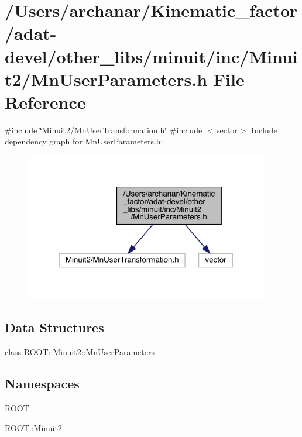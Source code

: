 \hypertarget{adat-devel_2other__libs_2minuit_2inc_2Minuit2_2MnUserParameters_8h}{}\section{/\+Users/archanar/\+Kinematic\+\_\+factor/adat-\/devel/other\+\_\+libs/minuit/inc/\+Minuit2/\+Mn\+User\+Parameters.h File Reference}
\label{adat-devel_2other__libs_2minuit_2inc_2Minuit2_2MnUserParameters_8h}
{\ttfamily \#include \char`\"{}Minuit2/\+Mn\+User\+Transformation.\+h\char`\"{}}\newline
{\ttfamily \#include $<$vector$>$}\newline
Include dependency graph for Mn\+User\+Parameters.\+h\+:
\nopagebreak
\begin{figure}[H]
\begin{center}
\leavevmode
\includegraphics[width=302pt]{d5/d43/adat-devel_2other__libs_2minuit_2inc_2Minuit2_2MnUserParameters_8h__incl}
\end{center}
\end{figure}
\subsection*{Data Structures}
\begin{DoxyCompactItemize}
\item 
class \mbox{\hyperlink{classROOT_1_1Minuit2_1_1MnUserParameters}{R\+O\+O\+T\+::\+Minuit2\+::\+Mn\+User\+Parameters}}
\end{DoxyCompactItemize}
\subsection*{Namespaces}
\begin{DoxyCompactItemize}
\item 
 \mbox{\hyperlink{namespaceROOT}{R\+O\+OT}}
\item 
 \mbox{\hyperlink{namespaceROOT_1_1Minuit2}{R\+O\+O\+T\+::\+Minuit2}}
\end{DoxyCompactItemize}
